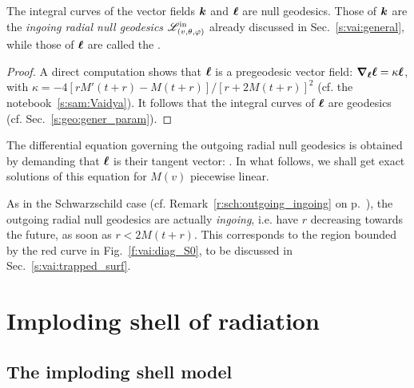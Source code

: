 \begin{prop}
The integral curves of the vector fields $\bm{k}$ and $\bm{\ell}$ are null geodesics.
Those of $\bm{k}$ are the \emph{ingoing radial null geodesics}
$\mathscr{L}^{\rm in}_{(v,\theta,\varphi)}$ already discussed in Sec.~\ref{s:vai:general},
while those of $\bm{\ell}$ are called the .
\end{prop}

\begin{proof}
A direct computation shows that $\bm{\ell}$ is a pregeodesic vector field:
$\bm{\nabla}_{\bm{\ell}} \bm{\ell} = \kappa \bm{\ell}$, with $\kappa = - 4 [rM'(t+r) - M(t+r)]/[r + 2M(t+r)]^2$
(cf. the notebook~\ref{s:sam:Vaidya}). It follows that the integral curves of
$\bm{\ell}$ are geodesics (cf. Sec.~\ref{s:geo:gener_param}).
\end{proof}
The differential equation governing the outgoing radial null geodesics
is obtained by demanding that $\bm{\ell}$ is their tangent vector:
\be \label{e:vai:ODE_outgoing_null}
    .
\ee
In what follows, we shall get exact solutions of this equation for $M(v)$ piecewise linear.

\begin{remark}
As in the Schwarzschild case (cf. Remark~\ref{r:sch:outgoing_ingoing}
on p.~\pageref{r:sch:outgoing_ingoing}),
the outgoing radial null geodesics are actually \emph{ingoing}, i.e. have $r$ decreasing towards the future,
as soon as $r < 2 M(t+r)$. This corresponds to the region bounded by the red curve in Fig.~\ref{f:vai:diag_S0}, to be discussed in Sec.~\ref{s:vai:trapped_surf}.
\end{remark}


\section{Imploding shell of radiation} \label{s:vai:infall}

\subsection{The imploding shell model} \label{s:vai:imploding_shell}

